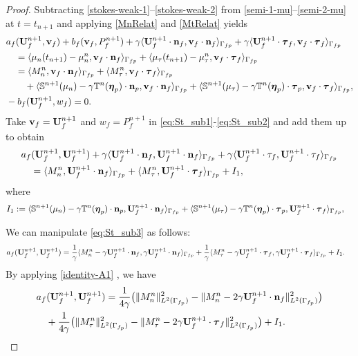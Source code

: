 \documentclass[11pt]{article}
\def\bv{{\bf v}}
\def\n{{\bf n}}
\def\btau{\boldsymbol{\tau}}
\def\bbeta{\boldsymbol{\eta}}
\def\U{{\bf U}}
\def\<{\langle}
\def\>{\rangle}
\begin{document}
\begin{proof}
{Subtracting \eqref{stokes-weak-1}--\eqref{stokes-weak-2} from \eqref{semi-1-mu}--\eqref{semi-2-mu} at $t = t_{n+1}$} and applying \eqref{MnRelat} and \eqref{MtRelat} yields
%
\begin{align}
  &
  a_f(\U_f^{n+1},\bv_f) + b_f(\bv_f, P_f^{n+1})
  + \gamma \< \U_f^{n+1} \cdot \n_f, \bv_f\cdot \n_f\>_{\Gamma_{fp}} + \gamma \<\U_f^{n+1}\cdot \btau_f, \bv_f\cdot \btau_f\>_{\Gamma_{fp}}\nonumber\\
  & \quad = \<\mu_n(t_{n+1}) - \mu_n^n, \bv_f\cdot \n_f\>_{\Gamma_{fp}}+ \<\mu_\tau(t_{n+1}) - \mu_\tau^n, \bv_f\cdot \btau_f\>_{\Gamma_{fp}}\nonumber \\
&\quad = \<M_n^n, \bv_f\cdot \n_f\>_{\Gamma_{fp}}+ \<M_\tau^n, \bv_f\cdot \btau_f\>_{\Gamma_{fp}}  \nonumber \\
&\quad \quad  + \< \mathbb{S}^{n+1}(\mu_n) - \gamma \mathbb{T}^n(\bbeta_p)\cdot \n_p,\bv_f \cdot \n_f\>_{\Gamma_{fp}}+ \< \mathbb{S}^{n+1}(\mu_\tau) - \gamma \mathbb{T}^n(\bbeta_p)\cdot \btau_p,\bv_f\cdot \btau_f\>_{\Gamma_{fp}}, \label{eq:St_sub1} \\
& - b_f(\U_f^{n+1},w_f) = 0. \label{eq:St_sub2}
\end{align}
%
Take $\bv_f = \U_f^{n+1}$ and $w_f = P_f^{n+1}$ in \eqref{eq:St_sub1}-\eqref{eq:St_sub2} and add them up to obtain
%
\begin{align}
  &
  a_f(\U_f^{n+1},\U_f^{n+1}) + \gamma \< \U_f^{n+1} \cdot \n_f, \U_f^{n+1}\cdot \n_f\>_{\Gamma_{fp}} + \gamma \<\U_f^{n+1}\cdot \tau_f, \U_f^{n+1}\cdot \tau_f\>_{\Gamma_{fp}} \nonumber\\
&\quad = \<M_n^n, \U_f^{n+1}\cdot \n_f\>_{\Gamma_{fp}}+ \<M_\tau^n, \U_f^{n+1}\cdot \btau_f\>_{\Gamma_{fp}}+ I_1, \label{eq:St_sub3}
\end{align}
where 
\begin{align}
& I_1 := \< \mathbb{S}^{n+1}(\mu_n) - \gamma \mathbb{T}^n(\bbeta_p)\cdot \n_p,\U_f^{n+1} \cdot \n_f\>_{\Gamma_{fp}}+ \< \mathbb{S}^{n+1}(\mu_\tau) - \gamma \mathbb{T}^n(\bbeta_p)\cdot \btau_p,\U_f^{n+1}\cdot \btau_f\>_{\Gamma_{fp}}, \label{H1}
\end{align}
%
%

We can manipulate \eqref{eq:St_sub3} as follows:
%
\begin{align*}
  & 
  a_f(\U_f^{n+1},\U_f^{n+1})
  = \frac{1}{\gamma}\<M_n^n - \gamma \U_f^{n+1} \cdot \n_f, \gamma \U_f^{n+1}\cdot \n_f\>_{\Gamma_{fp}} +\frac{1}{\gamma} \<M_\tau^n - \gamma \U_f^{n+1} \cdot \btau_f, \gamma \U_f^{n+1}\cdot \btau_f\>_{\Gamma_{fp}} + I_1.
\end{align*}
%
By applying \eqref{identity-A1} , we have
%
\begin{align}
  &   a_f(\U_f^{n+1},\U_f^{n+1})
= \frac{1}{4\gamma} \big( \|M_n^n\|_{L^2(\Gamma_{f_p})}^2 - \|M_n^n - 2\gamma \U_f^{n+1}\cdot \n_f\|_{L^2(\Gamma_{f_p})}^2\big)
\nonumber \\
& \quad
+ \frac{1}{4\gamma}\big(\|M_\tau^n\|_{L^2(\Gamma_{f_p})}^2 - \|M_\tau^n -2\gamma \U_f^{n+1}\cdot \btau_f\|_{L^2(\Gamma_{f_p})}^2\big) + I_1. \label{boundSTOKES}
\end{align}


\end{proof}
\end{document}
